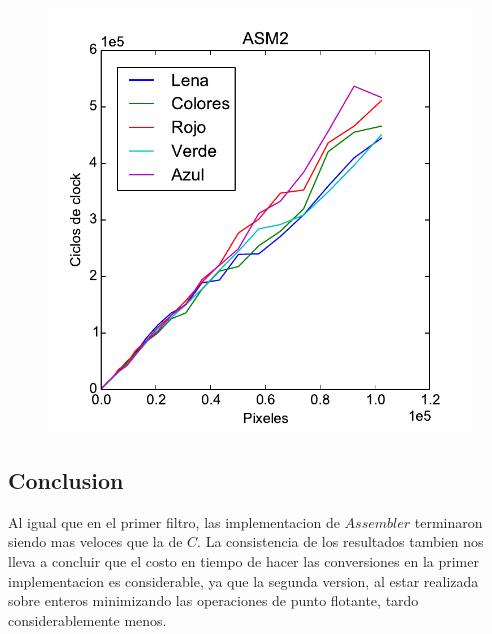 \begin{figure}[h!]
	\includegraphics[scale=0.45]{images/asm2_merge_lena_colors}
\end{figure}

\subsection{Conclusion}

Al igual que en el primer filtro, las implementacion de $Assembler$ terminaron siendo mas veloces que la de $C$. La consistencia de los resultados tambien nos lleva a concluir que el costo en tiempo de hacer las conversiones en la primer implementacion es considerable, ya que la segunda version, al estar realizada sobre enteros minimizando las operaciones de punto flotante, tardo considerablemente menos.